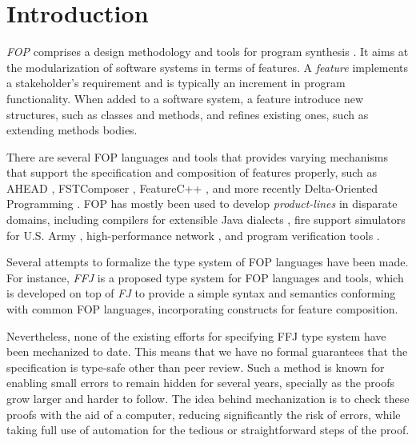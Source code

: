 
\section{Introduction}
\textit{\acf{FOP}} \cite{prehofer_feature-oriented_1997} comprises a design methodology and tools for program synthesis \cite{batory_tutorial_2003}.
It aims at the modularization of software systems in terms of features. A \textit{feature}
implements a stakeholder's requirement and is typically an increment in program functionality.
When added to a software system, a feature introduce new structures, such as classes and methods,
and refines existing ones, such as extending methods bodies.

There are several \ac{FOP} languages and tools that provides varying mechanisms
that support the specification and composition of features properly, such as AHEAD \cite{batory_feature-oriented_2004},
FSTComposer \cite{apel_superimposition:_2008}, FeatureC++ \cite{apel_featurec++:_2005}, and more recently Delta-Oriented Programming \cite{schaefer_delta-oriented_2010}. \ac{FOP} has mostly been used to develop
\textit{product-lines} in disparate domains, including compilers for extensible Java dialects 
\cite{batory_jts:_1998}, fire support simulators for U.S. Army \cite{batory_achieving_2000}, high-performance network
\cite{batory_design_1992}, and program verification tools \cite{kurt_stirewalt_component-based_2001}.

Several attempts to formalize the type system of \ac{FOP} languages have been made. 
For instance,  \textit{\acf{FFJ}} \cite{apel_feature_2008} is a proposed type system for \ac{FOP} languages and tools, 
which is developed on top of \textit{\acf{FJ}} \cite{igarashi_featherweight_2001}
to provide a simple syntax and semantics conforming with common \ac{FOP} languages, 
incorporating constructs for feature composition. %

Nevertheless, none of the existing efforts for specifying \ac{FFJ} type system have been mechanized to date.
This means that we have no formal guarantees that the specification is type-safe other than peer review. 
Such a method is known for enabling small errors to remain hidden for several years, specially as the proofs grow larger and harder to follow.
The idea behind mechanization is to check these proofs with the aid of a computer, reducing significantly the risk of errors, while 
taking full use of automation for the tedious or straightforward steps of the proof.

